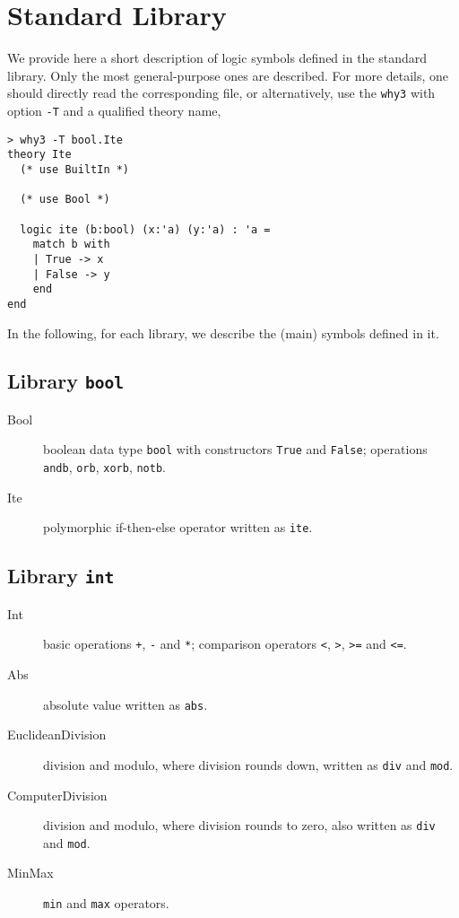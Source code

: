 \chapter{Standard Library}
\label{chap:library}

We provide here a short description of logic symbols defined in the
standard library. Only the most general-purpose ones are
described. For more details, one should directly read the
corresponding file, or alternatively, use the \verb|why3| with option \verb|-T| and a qualified theory name, \eg
\begin{verbatim}
> why3 -T bool.Ite
theory Ite
  (* use BuiltIn *)
  
  (* use Bool *)
  
  logic ite (b:bool) (x:'a) (y:'a) : 'a =
    match b with
    | True -> x
    | False -> y
    end
end
\end{verbatim}

In the following, for each library, we describe the (main) symbols
defined in it.

\section{Library \texttt{bool}}

\begin{description}

\item[Bool] boolean data type \verb|bool| with constructors \verb|True| and
  \verb|False|; operations \verb|andb|, \verb|orb|, \verb|xorb|, \verb|notb|.

\item[Ite] polymorphic if-then-else operator written as \verb|ite|.

\end{description}

\section{Library \texttt{int}}

\begin{description}

\item[Int] basic operations \verb|+|, \verb|-| and \verb|*|; comparison
  operators \verb|<|, \verb|>|, \verb|>=| and \verb|<=|.

\item[Abs] absolute value written as \verb|abs|.

\item[EuclideanDivision] division and modulo, where division rounds
  down, written as \verb|div| and \verb|mod|.

\item[ComputerDivision] division and modulo, where division rounds to
  zero, also written as \verb|div| and \verb|mod|.

\item[MinMax] \verb|min| and \verb|max| operators.

\end{description}

